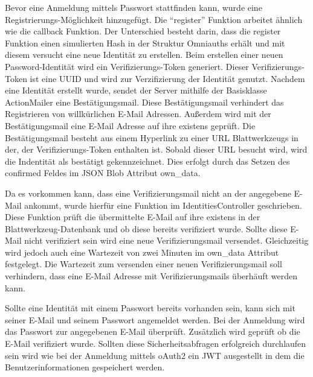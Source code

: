 \begin{description}
	Bevor eine Anmeldung mittels Passwort stattfinden kann, wurde eine Registrierungs-Möglichkeit hinzugefügt. Die \enquote{register} Funktion arbeitet ähnlich wie die callback Funktion. Der Unterschied besteht darin, dass die register Funktion einen simulierten Hash in der Struktur Omniauths erhält und mit diesem versucht eine neue Identität zu erstellen. Beim erstellen einer neuen Password-Identität wird ein Verifizierungs-Token generiert. Dieser Verifizierungs-Token ist eine \gls{UUID} und wird zur Verzifizierung der Identität genutzt. Nachdem eine Identität erstellt wurde, sendet der Server mithilfe der Basisklasse ActionMailer eine Bestätigungsmail. Diese Bestätigungsmail verhindert das Registrieren von willkürlichen E-Mail Adressen. Außerdem wird  mit der Bestätigungsmail eine E-Mail Adresse auf ihre existens geprüft. Die Bestätigungsmail besteht aus einem Hyperlink zu einer \gls{URL} Blattwerkzeugs in der, der Verifizierungs-Token enthalten ist. Sobald dieser \gls{URL} besucht wird, wird die Indentität als bestätigt gekennzeichnet. Dies erfolgt durch das Setzen des confirmed Feldes im JSON Blob Attribut own\_data.

	Da es vorkommen kann, dass eine Verifizierungsmail nicht an der angegebene E-Mail ankommt, wurde hierfür eine Funktion im IdentitiesController geschrieben. Diese Funktion prüft die übermittelte E-Mail auf ihre existens in der Blattwerkzeug-Datenbank und ob diese bereits verifiziert wurde. Sollte diese E-Mail nicht verifiziert sein wird eine neue Verifizierungsmail versendet. Gleichzeitig wird jedoch auch eine Wartezeit von zwei Minuten im own\_data Attribut festgelegt. Die Wartezeit zum versenden einer neuen Verifizierungsmail soll verhindern, dass eine E-Mail Adresse mit Verifizierungsmails überhäuft werden kann.

	Sollte eine Identität mit einem Passwort bereits vorhanden sein, kann sich mit seiner E-Mail und seinem Passwort angemeldet werden. Bei der Anmeldung wird das Passwort zur angegebenen E-Mail überprüft. Zusätzlich wird geprüft ob die E-Mail verifiziert wurde. Sollten diese Sicherheitsabfragen erfolgreich durchlaufen sein wird wie bei der Anmeldung mittels \gls{oAuth2} ein \gls{JWT} ausgestellt in dem die Benutzerinformationen gespeichert werden.


\end{description}
